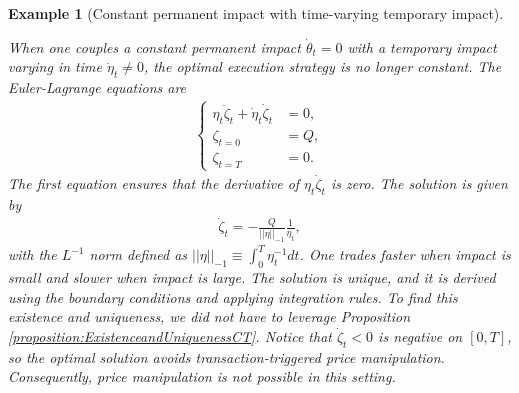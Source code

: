 \documentclass[final,3p,authoryear,12pt]{elsarticle}
\newtheorem{example}{Example}
\begin{document}
\begin{example}[Constant permanent impact with time-varying temporary impact]
\label{example:constantpermanentCT}

When one couples a constant permanent impact $\dot{\theta}_t=0$ with a temporary impact varying in time $\dot{\eta}_t\ne0$, the optimal execution strategy is no longer constant. The Euler-Lagrange equations are
\begin{align}
    \begin{cases}
    \eta_t \ddot \zeta_t+\dot \eta_t\dot \zeta_t&=0,\\
    \zeta_{t=0}&=Q,\\
    \zeta_{t=T}&=0.
\end{cases}
\end{align}
The first equation ensures that the derivative of $\eta_t\dot\zeta_t$ is zero. The solution is given by
\begin{eqnarray}
\label{CT_and_DT_are_not_consistent}
     \dot \zeta_{t}=-\frac{Q}{||\eta||_{-1}} \frac{1}{\eta_t},
\end{eqnarray}
with the $L^{-1}$ norm defined as $||\eta||_{-1}\equiv \int_0^T \eta_t^{-1}dt$. One trades faster when impact is small and slower when impact is large. The solution is unique, and it is derived using the boundary conditions and applying integration rules. To find this existence and uniqueness, we did not have to leverage Proposition \ref{proposition:ExistenceandUniquenessCT}. Notice that $ \dot \zeta_{t} < 0$ is negative on $[0,T]$, so the optimal solution avoids transaction-triggered price manipulation. Consequently, price manipulation is not possible in this setting.
\end{example}
\end{document}
